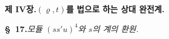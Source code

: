 
\begin{center}
{\Large\bfseries 제 IV장.\quad $(\varrho,t)$를 법으로 하는 상대 완전계.}
\end{center}

\begin{center}
\textbf{\S\ 17.}\quad\emph{모듈 $(ss'u)^4$와 $s$의 계의 환원.}
\end{center}

